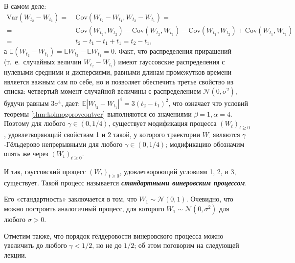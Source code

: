 \documentclass[10pt]{article}
\theoremstyle{boldnormal}
\newcommand{\EE}{{\ensuremath{\mathbb{E}}}}
\theoremstyle{boldremark}
\begin{document}
В самом деле:
\begin{align*}\text{Var}(W_{t_2}-W_{t_1}) 
    = & \ \text{Cov}(W_{t_2}-W_{t_1}, W_{t_2}-W_{t_1}) = 
    \\    
= & \ \text{Cov}(W_{t_2}, W_{t_2}) - \text{Cov}(W_{t_2}, W_{t_1}) 
- \text{Cov}(W_{t_1}, W_{t_2}) + \text{Cov}(W_{t_1}, W_{t_1}) 
\\
= & \  t_2-t_1-t_1+t_1 = t_2-t_1,
\end{align*}
а $\EE(W_{t_2}-W_{t_1})=\EE W_{t_2}- \EE W_{t_1} =0$.
Факт, что распределения приращений (т.~е.~случайных величин \(W_{t_2}-W_{t_1}\))
имеют гауссовские распределения с нулевыми средними и дисперсиями, равными 
длинам промежутков времени является важным сам по себе, но и позволяет 
обеспечить третье свойство из списка: четвертый момент случайной 
величины с распределением \(\mathcal{N}(0,\sigma^2)\), будучи 
равным \(3\sigma^4\), дает:
$\EE|W_{t_2}-W_{t_1}|^4 = 3(t_2-t_1)^2$, что означает 
что условий теоремы \ref{thm:kolmogorovcontver} 
выполняются со значениями \(\beta = 1, \alpha = 4\).
Поэтому для любого $\gamma \in (0, 1/4)$,
существует модификация процесса \((W_t)_{t\geq 0}\), удовлетворяющий 
свойствам 1 и 2 такой, у которого
траектории $W_{\cdot}$
являются $\gamma$-Гёльдерово непрерывными для любого 
\(\gamma\in (0,1/4)\); модификацию обозначим 
опять же через \((W_t)_{t\geq 0}\).

И так, гауссовский процесс \((W_t)_{t\geq 0}\),
удовлетворяющий условиям 1, 2, и 3, существует. Такой процесс 
называется \textit{\textbf{стандартными винеровским процессом}}.

Его «стандартность» заключается в том, что 
\(W_1 \sim \mathcal{N}(0,1)\). Очевидно, что можно 
построить аналогичный процесс, для которого \(W_1 \sim \mathcal{N}(0,\sigma^2)\)
для любого \(\sigma > 0\).

Отметим также, что порядок гёлдеровости винеровского процесса
можно увеличить до любого \(\gamma < 1/2\), но не до \(1/2\);
об этом поговорим на следующей лекции.
\end{document}
